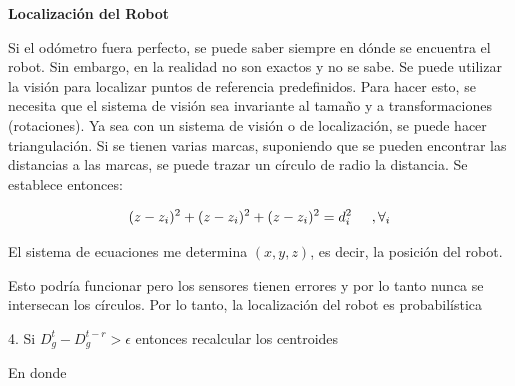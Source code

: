 \textbf{Localización del Robot}


Si el odómetro fuera perfecto, se puede saber siempre en dónde se encuentra el robot. Sin embargo, en la
realidad no son exactos y no se sabe.
Se puede utilizar la visión para localizar puntos de referencia predefinidos.
Para hacer esto, se necesita que el sistema de visión sea invariante al tamaño y a transformaciones
(rotaciones).
Ya sea con un sistema de visión o de localización, se puede hacer triangulación.
Si se tienen varias marcas, suponiendo que se pueden encontrar las distancias a las marcas, se puede trazar un
círculo de radio la distancia.
Se establece entonces:

$$(z-z_i)^2 + (z-z_i)^2 + (z-z_i)^2 =d_{i}^2 \hspace{0.5cm} ,   \forall_i$$

El sistema de ecuaciones me determina $(x , y , z)$, es decir, la posición del robot.

Esto podría funcionar pero los sensores tienen errores y por lo tanto nunca se intersecan los círculos.
Por lo tanto, la localización del robot es probabilística

4. Si $D_{g}^t - D_{g}^{t-r} > \epsilon $ entonces recalcular los centroides



En donde 

